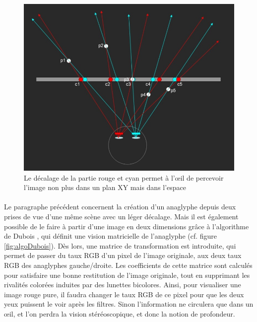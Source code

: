 \begin{figure}[h]
		\centering
		\includegraphics[scale=1]{anaglyph.png}
		\caption{\label{fig:anaglyph} Le décalage de la partie rouge et cyan permet à l’œil de percevoir l’image non plus dans un plan XY mais dans l’espace \protect \footnotemark }
\end{figure}

\paragraph{}
	Le paragraphe précédent concernent la création d’un anaglyphe depuis deux prises de vue d’une même scène avec un léger décalage. Mais il est également possible de le faire à partir d’une image en deux dimensions grâce à l’algorithme de Dubois \cite{algoDubois}, qui définit une vision matricielle de l’anaglyphe (cf. figure \ref{fig:algoDubois}). Dès lors, une matrice de transformation est introduite, qui permet de passer du taux RGB d’un pixel de l’image originale,  aux deux taux RGB des anaglyphes gauche/droite. Les coefficients de cette matrice sont calculés pour satisfaire une bonne restitution de l’image originale, tout en supprimant les rivalités colorées induites par des lunettes bicolores. Ainsi, pour visualiser une image rouge pure, il faudra changer le taux RGB de ce pixel pour que les deux yeux puissent le voir après les filtres. Sinon l’information ne circulera que dans un œil, et l’on perdra la vision stéréoscopique, et donc la notion de profondeur. 
	
